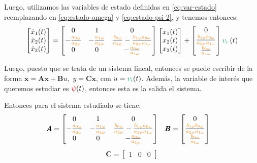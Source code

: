 Luego, utilizamos las variables de estado definidas en \eqref{eq:var-estado}
reemplazando en \eqref{eq:estado-omega} y \eqref{eq:estado-psi-2}, y tenemos
entonces:
\begin{equation}\label{eq:estado-sistema}
  \begin{bmatrix}\dot x_{1}(t) \\ \dot x_{2}(t) \\ \dot x_{3}(t)\end{bmatrix} =
    \begin{bmatrix}
      0 & 1 & 0 \\
      -\frac{\nara{a_{0\psi}}}{\nara{a_{2\psi}}}   & -\frac{\nara{a_{1\psi}}}{\nara{a_{2\psi}}} & \frac{\nara{b_{0\psi}}}{\nara{a_{2\psi}}} - \frac{\nara{b_{1\psi}}\nara{a_{0\omega}}}{\nara{a_{2\psi}}\nara{a_{1\omega}}} \\
      0 & 0 & -\frac{\nara{a_{0\omega}}}{\nara{a_{1\omega}}}
    \end{bmatrix}
    \begin{bmatrix}x_{1}(t) \\ x_{2}(t) \\ x_{3}(t)\end{bmatrix} +
    \begin{bmatrix}
      0 \\
      \frac{\nara{b_{1\psi}}\nara{b_{0\omega}}}{\nara{a_{2\psi}}\nara{a_{1\omega}}} \\
      \frac{\nara{b_{0\omega}}}{\nara{a_{1\omega}}}
    \end{bmatrix}
    \verd{v_{i}} (t)
\end{equation}

Luego, puesto que se trata de un sistema lineal, entonces se puede escribir
de la forma $\mathbf{\dot x} = \pmb{A}\mathbf{x} + \pmb{B}u,$ $y = \pmb{C}\mathbf{x}$,
con $u = \verd{v_{i}} (t)$. Además, la variable de interés que queremos estudiar
es $\mathbin{\color{red}\psi}(t)$, entonces esta es la salida el sistema.

Entonces para el sistema estudiado se tiene:
\begin{align}
  \pmb{A} &= \begin{bmatrix}
      0 & 1 & 0 \\
      -\frac{\nara{a_{0\psi}}}{\nara{a_{2\psi}}}   & -\frac{\nara{a_{1\psi}}}{\nara{a_{2\psi}}} & \frac{\nara{b_{0\psi}}}{\nara{a_{2\psi}}} - \frac{\nara{b_{1\psi}}\nara{a_{0\omega}}}{\nara{a_{2\psi}}\nara{a_{1\omega}}} \\
      0 & 0 & -\frac{\nara{a_{0\omega}}}{\nara{a_{1\omega}}}
  \end{bmatrix} &
  \pmb{B} &= \begin{bmatrix}
      0 \\
      \frac{\nara{b_{1\psi}}\nara{b_{0\omega}}}{\nara{a_{2\psi}}\nara{a_{1\omega}}} \\
      \frac{\nara{b_{0\omega}}}{\nara{a_{1\omega}}}
  \end{bmatrix}
\end{align}
\begin{align}
  \pmb{C} = \begin{bmatrix}
    1 & 0 & 0
  \end{bmatrix}
\end{align}

